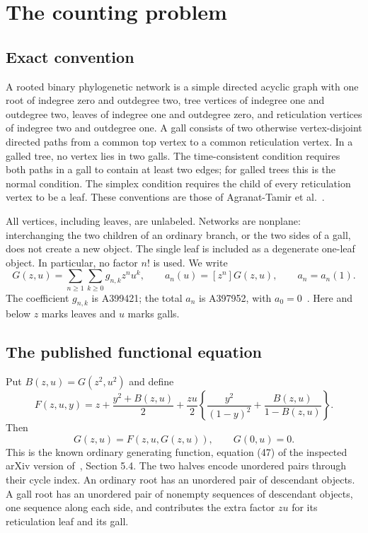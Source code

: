 \documentclass[11pt,letterpaper]{article}
\numberwithin{equation}{section}
\theoremstyle{definition}\newtheorem{definition}[theorem]{Definition}
\theoremstyle{remark}\newtheorem{remark}[theorem]{Remark}
\begin{document}
\section{The counting problem}\label{gal:sec:common}
\subsection{Exact convention}
A rooted binary phylogenetic network is a simple directed acyclic graph with one root of indegree zero and outdegree two, tree vertices of indegree one and outdegree two, leaves of indegree one and outdegree zero, and reticulation vertices of indegree two and outdegree one. A gall consists of two otherwise vertex-disjoint directed paths from a common top vertex to a common reticulation vertex. In a galled tree, no vertex lies in two galls. The time-consistent condition requires both paths in a gall to contain at least two edges; for galled trees this is the normal condition. The simplex condition requires the child of every reticulation vertex to be a leaf. These conventions are those of Agranat-Tamir et al.~\cite{comparison}.

All vertices, including leaves, are unlabeled. Networks are nonplane: interchanging the two children of an ordinary branch, or the two sides of a gall, does not create a new object. The single leaf is included as a degenerate one-leaf object. In particular, no factor $n!$ is used. We write
\begin{equation}\label{gal:eq:G}
G(z,u)=\sum_{n\geq1}\sum_{k\geq0}g_{n,k}z^n u^k,
\qquad a_n(u)=[z^n]G(z,u),\qquad a_n=a_n(1).
\end{equation}
The coefficient $g_{n,k}$ is A399421; the total $a_n$ is A397952, with $a_0=0$~\cite{oeis399421,oeis397952}. Here and below $z$ marks leaves and $u$ marks galls.

\subsection{The published functional equation}
Put $B(z,u)=G(z^2,u^2)$ and define
\begin{equation}\label{gal:eq:F}
F(z,u,y)=z+\frac{y^2+B(z,u)}2
 +\frac{zu}{2}\left\{\frac{y^2}{(1-y)^2}+\frac{B(z,u)}{1-B(z,u)}\right\}.
\end{equation}
Then
\begin{equation}\label{gal:eq:implicit}
G(z,u)=F(z,u,G(z,u)),\qquad G(0,u)=0.
\end{equation}
This is the known ordinary generating function, equation (47) of the inspected arXiv version of~\cite{comparison}, Section 5.4. The two halves encode unordered pairs through their cycle index. An ordinary root has an unordered pair of descendant objects. A gall root has an unordered pair of nonempty sequences of descendant objects, one sequence along each side, and contributes the extra factor $zu$ for its reticulation leaf and its gall.
\end{document}
